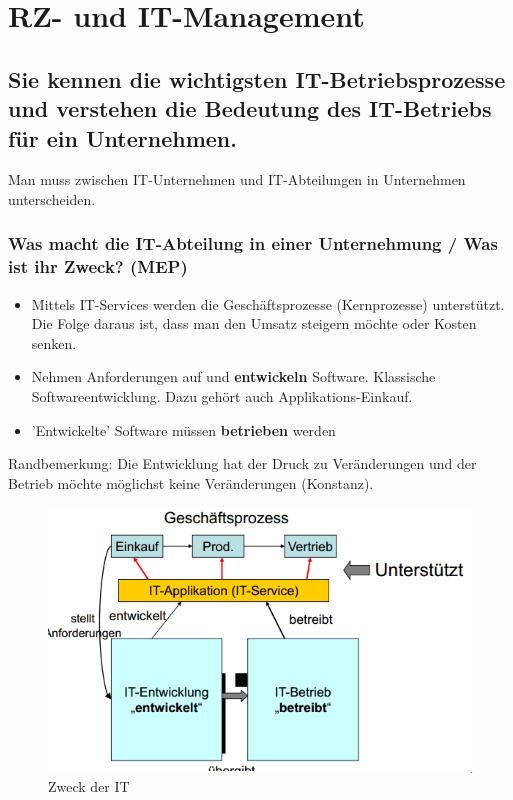 \chapter{RZ- und IT-Management}

\section{Sie kennen die wichtigsten IT-Betriebsprozesse und	verstehen die Bedeutung des IT-Betriebs für ein	Unternehmen.}

Man muss zwischen IT-Unternehmen und IT-Abteilungen in Unternehmen unterscheiden.

\subsection{Was macht die IT-Abteilung in einer Unternehmung / Was ist ihr Zweck? (MEP)}
\begin{itemize}
	\item Mittels IT-Services werden die Geschäftsprozesse (Kernprozesse) unterstützt. Die Folge daraus ist, dass man den Umsatz steigern möchte oder Kosten senken.
	\item Nehmen Anforderungen auf und \textbf{entwickeln} Software. Klassische Softwareentwicklung. Dazu gehört auch Applikations-Einkauf.
	\item 'Entwickelte' Software müssen \textbf{betrieben} werden
\end{itemize}
Randbemerkung: Die Entwicklung hat der Druck zu Veränderungen und der Betrieb möchte möglichst keine Veränderungen (Konstanz).

\begin{figure}[h]
	\centering
	\includegraphics{fig/zweck-der-it}
	\caption{Zweck der IT}
\end{figure}

